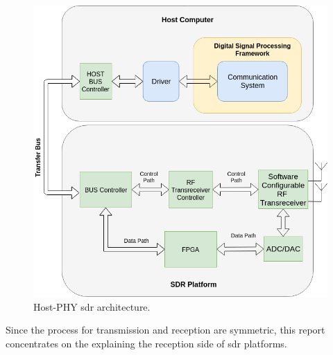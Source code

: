 \begin{figure}[h!]
\centering
\includegraphics[width=\textwidth]{Figure/Host_Phy.png}
\caption{Host-PHY \cite{nychis_enabling_nodate} \ac{sdr} architecture.}
\label{host_PHY}
\end{figure}


Since the process for transmission and reception are symmetric, this report concentrates on the explaining the reception side of 
\ac{sdr} platforms.

